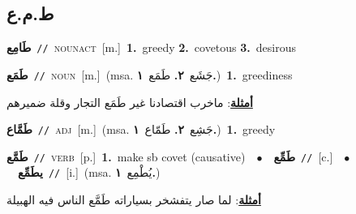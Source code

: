\documentclass[10pt,a4paper,twoside]{article} %
\begin{document}
\begin{multicols}{2}
\vspace{-3mm}
\subsection*{\color{blue}\foreignlanguage{arabic}{ط.م.ع}\color{blue}{}} 

{\setlength\topsep{0pt}\textbf{\foreignlanguage{arabic}{طَامِع}}\ {\color{gray}\texttt{//}\color{black}}\ \textsc{noun\textunderscore act}\ [m.]\ \textbf{1.}~greedy  \textbf{2.}~covetous  \textbf{3.}~desirous\ } \vspace{2mm}

{\setlength\topsep{0pt}\textbf{\foreignlanguage{arabic}{طَمَع}}\ {\color{gray}\texttt{//}\color{black}}\ \textsc{noun}\ [m.]\ \color{gray}(msa. \foreignlanguage{arabic}{جَشَع}~\foreignlanguage{arabic}{\textbf{٢.}}  \foreignlanguage{arabic}{طَمَع}~\foreignlanguage{arabic}{\textbf{١.}})\color{black}\ \textbf{1.}~greediness\  \begin{flushright}\color{gray}\foreignlanguage{arabic}{\textbf{\underline{\foreignlanguage{arabic}{أمثلة}}}: ماخرب اقتصادنا غير طَمَع التجار وقلة ضميرهم}\end{flushright}\color{black}} \vspace{2mm}

{\setlength\topsep{0pt}\textbf{\foreignlanguage{arabic}{طَمَّاع}}\ {\color{gray}\texttt{//}\color{black}}\ \textsc{adj}\ [m.]\ \color{gray}(msa. \foreignlanguage{arabic}{جَشِع}~\foreignlanguage{arabic}{\textbf{٢.}}  \foreignlanguage{arabic}{طَمّاع}~\foreignlanguage{arabic}{\textbf{١.}})\color{black}\ \textbf{1.}~greedy\ } \vspace{2mm}

{\setlength\topsep{0pt}\textbf{\foreignlanguage{arabic}{طَمَّع}}\ {\color{gray}\texttt{//}\color{black}}\ \textsc{verb}\ [p.]\ \textbf{1.}~make sb covet (causative)\ \ $\bullet$\ \ \setlength\topsep{0pt}\textbf{\foreignlanguage{arabic}{طَمِّع}}\ {\color{gray}\texttt{//}\color{black}}\ [c.]\ \ $\bullet$\ \ \setlength\topsep{0pt}\textbf{\foreignlanguage{arabic}{يطَمِّع}}\ {\color{gray}\texttt{//}\color{black}}\ [i.]\ \color{gray}(msa. \foreignlanguage{arabic}{يُطْمِع}~\foreignlanguage{arabic}{\textbf{١.}})\color{black}\  \begin{flushright}\color{gray}\foreignlanguage{arabic}{\textbf{\underline{\foreignlanguage{arabic}{أمثلة}}}: لما صار يتفشخر بسياراته طَمَّع الناس فيه الهبيلة}\end{flushright}\color{black}} \vspace{2mm}


\end{multicols}
\end{document}
